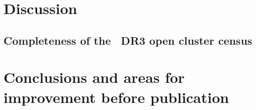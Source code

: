 \section{Discussion}
\label{sec:dynamics:discussion}


\subsection{Completeness of the \gaia\ DR3 open cluster census}
\label{sec:dynamics:results:completeness}


\section{Conclusions and areas for improvement before publication}
\label{sec:dynamics:conclusion}
